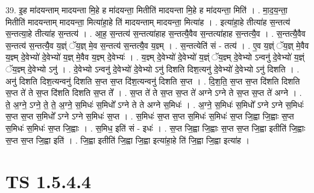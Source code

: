 \documentclass[17pt]{extarticle}
\begin{document}
39. इ॒ह मा॑दयन्ताम् मादयन्ता मि॒हे ह मा॑दयन्ता॒ मितीति॑ मादयन्ता मि॒हे ह मा॑दयन्ता॒ मिति॑ । . मा॒द॒य॒न्ता॒ मितीति॑ मादयन्ताम् मादयन्ता॒ मित्या॑हा॒हे ति॑ मादयन्ताम् मादयन्ता॒ मित्या॑ह । . इत्या॑हा॒हे तीत्या॑ह स॒न्तत्य॑ स॒न्तत्या॒हे तीत्या॑ह स॒न्तत्य॑ । . आ॒ह॒ स॒न्तत्य॑ स॒न्तत्या॑हाह स॒न्तत्यै॒वैव स॒न्तत्या॑हाह स॒न्तत्यै॒व । . स॒न्तत्यै॒वैव स॒न्तत्य॑ स॒न्तत्यै॒व य॒ज्ञ्ं ॅय॒ज्ञ् मे॒व स॒न्तत्य॑ स॒न्तत्यै॒व य॒ज्ञ्म् । . स॒न्तत्येति॑ सं - तत्य॑ । . ए॒व य॒ज्ञ्ं ॅय॒ज्ञ् मे॒वैव य॒ज्ञ्म् दे॒वेभ्यो॑ दे॒वेभ्यो॑ य॒ज्ञ् मे॒वैव य॒ज्ञ्म् दे॒वेभ्यः॑ । . य॒ज्ञ्म् दे॒वेभ्यो॑ दे॒वेभ्यो॑ य॒ज्ञ्ं ॅय॒ज्ञ्म् दे॒वेभ्यो ऽन्वनु॑ दे॒वेभ्यो॑ य॒ज्ञ्ं ॅय॒ज्ञ्म् दे॒वेभ्यो ऽनु॑ । . दे॒वेभ्यो ऽन्वनु॑ दे॒वेभ्यो॑ दे॒वेभ्यो ऽनु॑ दिशति दिश॒त्यनु॑ दे॒वेभ्यो॑ दे॒वेभ्यो ऽनु॑ दिशति । . अनु॑ दिशति दिश॒त्यन्वनु॑ दिशति स॒प्त स॒प्त दि॑श॒त्यन्वनु॑ दिशति स॒प्त । . दि॒श॒ति॒ स॒प्त स॒प्त दि॑शति दिशति स॒प्त ते॑ ते स॒प्त दि॑शति दिशति स॒प्त ते᳚ । . स॒प्त ते॑ ते स॒प्त स॒प्त ते॑ अग्ने ऽग्ने ते स॒प्त स॒प्त ते॑ अग्ने । . ते॒ अ॒ग्ने॒ ऽग्ने॒ ते॒ ते॒ अ॒ग्ने॒ स॒मिधः॑ स॒मिधो᳚ ऽग्ने ते ते अग्ने स॒मिधः॑ । . अ॒ग्ने॒ स॒मिधः॑ स॒मिधो᳚ ऽग्ने ऽग्ने स॒मिधः॑ स॒प्त स॒प्त स॒मिधो᳚ ऽग्ने ऽग्ने स॒मिधः॑ स॒प्त । . स॒मिधः॑ स॒प्त स॒प्त स॒मिधः॑ स॒मिधः॑ स॒प्त जि॒ह्वा जि॒ह्वाः स॒प्त स॒मिधः॑ स॒मिधः॑ स॒प्त जि॒ह्वाः । . स॒मिध॒ इति॑ सं - इधः॑ । . स॒प्त जि॒ह्वा जि॒ह्वाः स॒प्त स॒प्त जि॒ह्वा इतीति॑ जि॒ह्वाः स॒प्त स॒प्त जि॒ह्वा इति॑ । . जि॒ह्वा इतीति॑ जि॒ह्वा जि॒ह्वा इत्या॑हा॒हे ति॑ जि॒ह्वा जि॒ह्वा इत्या॑ह । \newline
\pagebreak
{}

\section{ TS 1.5.4.4 }
\end{document}

